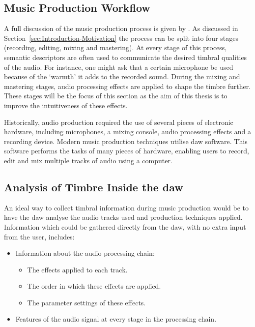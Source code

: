 	\subsection{Music Production Workflow}
	\label{sec:TimbreEvaluation-DAWBasedTimbreEvaluation-Workflow}
		A full discussion of the music production process is given by \citet{dittmar2013audio}. As discussed in
		Section~\ref{sec:Introduction-Motivation} the process can be split into four stages (recording, editing,
		mixing and mastering). At every stage of this process, semantic descriptors are often used to communicate
		the desired timbral qualities of the audio. For instance, one might ask that a certain microphone be used
		because of the `warmth' it adds to the recorded sound. During the mixing and mastering stages, audio
		processing effects are applied to shape the timbre further. These stages will be the focus of this section
		as the aim of this thesis is to improve the intuitiveness of these effects.

		Historically, audio production required the use of several pieces of electronic hardware, including
		microphones, a mixing console, audio processing effects and a recording device. Modern music production
		techniques utilise \acrfull{daw} software. This software performs the tasks of many pieces of hardware,
		enabling users to record, edit and mix multiple tracks of audio using a computer. 
		
	\subsection{Analysis of Timbre Inside the \acrshort{daw}}
	\label{sec:TimbreEvaluation-DAWBasedTimbreEvaluation-InDAW}
		An ideal way to collect timbral information during music production would be to have the \acrshort{daw}
		analyse the audio tracks used and production techniques applied. Information which could be gathered
		directly from the \acrshort{daw}, with no extra input from the user, includes:

		\begin{itemize}
			\item Information about the audio processing chain:
			\begin{itemize}
				\item The effects applied to each track.
				\item The order in which these effects are applied.
				\item The parameter settings of these effects.
			\end{itemize}
			\item Features of the audio signal at every stage in the processing chain.
		\end{itemize}

